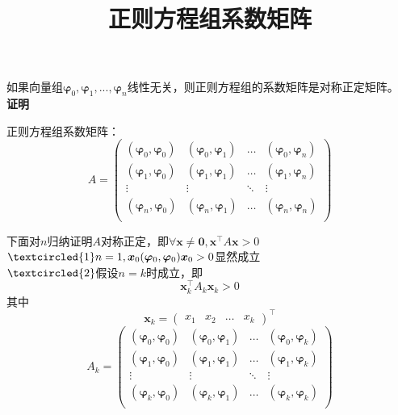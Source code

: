 \documentclass{article}
\begin{document}
\begin{CJK*}{UTF8}{gbsn}

\title{正则方程组系数矩阵}
\date{}
\maketitle

如果向量组$\bm{\varphi}_0, \bm{\varphi}_1, ..., \bm{\varphi}_n$线性无关，则正则方程组的系数矩阵是对称正定矩阵。\\

\textbf{证明}

正则方程组系数矩阵：
\[
A = 
\left(
\begin{array}{cccc}
(\bm{\varphi}_0, \bm{\varphi}_0) & (\bm{\varphi}_0, \bm{\varphi}_1) & \ldots & (\bm{\varphi}_0, \bm{\varphi}_n) \\
(\bm{\varphi}_1, \bm{\varphi}_0) & (\bm{\varphi}_1, \bm{\varphi}_1) & \ldots & (\bm{\varphi}_1, \bm{\varphi}_n) \\
\vdots & \vdots & \ddots & \vdots \\
(\bm{\varphi}_n, \bm{\varphi}_0) & (\bm{\varphi}_n, \bm{\varphi}_1) & \ldots & (\bm{\varphi}_n, \bm{\varphi}_n) \\
\end{array}
\right)
\]

下面对$n$归纳证明$A$对称正定，即$\forall \bm{x} \neq \bm{0}, \bm{x}^\top A \bm{x} > 0$ \\

$\textcircled{1} n = 1, \bm{x}_0(\bm{\varphi}_0, \bm{\varphi}_0)\bm{x}_0 > 0$显然成立 \\

$\textcircled{2}$假设$n = k$时成立，即 \\
\[ \bm{x}_k^\top A_k \bm{x}_k > 0 \]
其中
\[
\bm{x}_k =
\left(
\begin{array}{cccc}
x_1 & x_2 & \ldots & x_k
\end{array}
\right)^\top
\]
\[
A_k = 
\left(
\begin{array}{cccc}
(\bm{\varphi}_0, \bm{\varphi}_0) & (\bm{\varphi}_0, \bm{\varphi}_1) & \ldots & (\bm{\varphi}_0, \bm{\varphi}_k) \\
(\bm{\varphi}_1, \bm{\varphi}_0) & (\bm{\varphi}_1, \bm{\varphi}_1) & \ldots & (\bm{\varphi}_1, \bm{\varphi}_k) \\
\vdots & \vdots & \ddots & \vdots \\
(\bm{\varphi}_k, \bm{\varphi}_0) & (\bm{\varphi}_k, \bm{\varphi}_1) & \ldots & (\bm{\varphi}_k, \bm{\varphi}_k) \\
\end{array}
\right)
\]


\end{CJK*}
\end{document}
